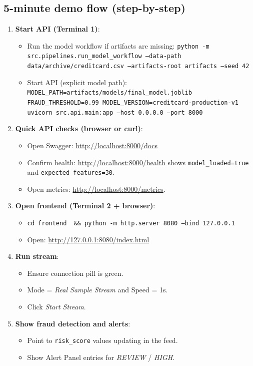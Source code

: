 \documentclass[11pt]{article}
\newcommand{\code}[1]{\texttt{#1}}
\begin{document}
\subsection*{5-minute demo flow (step-by-step)}
\begin{enumerate}[leftmargin=1.5em]
  \item \textbf{Start API (Terminal 1)}:
  \begin{itemize}
    \item Run the model workflow if artifacts are missing:
      \code{python -m src.pipelines.run\_model\_workflow --data-path data/archive/creditcard.csv --artifacts-root artifacts --seed 42}
    \item Start API (explicit model path):
      \code{MODEL\_PATH=artifacts/models/final\_model.joblib FRAUD\_THRESHOLD=0.99 MODEL\_VERSION=creditcard-production-v1 uvicorn src.api.main:app --host 0.0.0.0 --port 8000}
  \end{itemize}

  \item \textbf{Quick API checks (browser or curl)}:
  \begin{itemize}
    \item Open Swagger: \url{http://localhost:8000/docs}
    \item Confirm health: \url{http://localhost:8000/health} shows \code{model\_loaded=true} and \code{expected\_features=30}.
    \item Open metrics: \url{http://localhost:8000/metrics}.
  \end{itemize}

  \item \textbf{Open frontend (Terminal 2 + browser)}:
  \begin{itemize}
    \item \code{cd frontend \ \&\&\  python -m http.server 8080 --bind 127.0.0.1}
    \item Open: \url{http://127.0.0.1:8080/index.html}
  \end{itemize}

  \item \textbf{Run stream}:
  \begin{itemize}
    \item Ensure connection pill is green.
    \item Mode = \emph{Real Sample Stream} and Speed = 1s.
    \item Click \emph{Start Stream}.
  \end{itemize}

  \item \textbf{Show fraud detection and alerts}:
  \begin{itemize}
    \item Point to \code{risk\_score} values updating in the feed.
    \item Show Alert Panel entries for \emph{REVIEW} / \emph{HIGH}.
  \end{itemize}


\end{enumerate}
\end{document}
